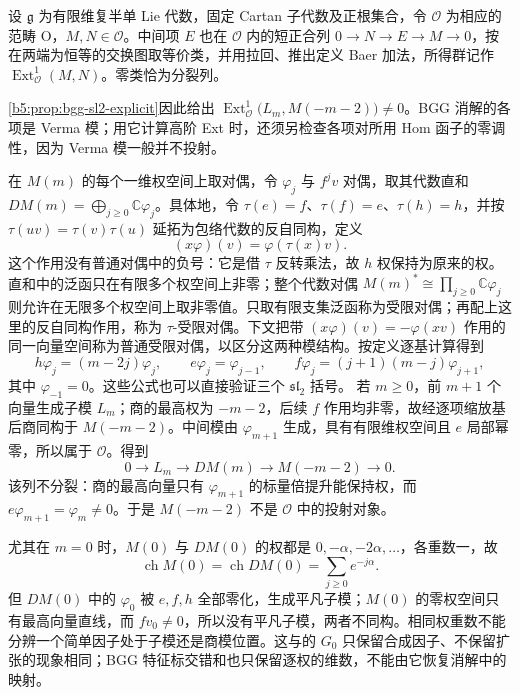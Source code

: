 \begin{definition}\label{b5:def:yoneda-ext-o}
	设 \(\mathfrak g\) 为有限维复半单 Lie 代数，固定 Cartan 子代数及正根集合，令 \(\mathcal O\) 为相应的范畴 O，\(M,N\in\mathcal O\)。中间项 \(E\) 也在 \(\mathcal O\) 内的短正合列 \(0\to N\to E\to M\to0\)，按在两端为恒等的交换图取等价类，并用拉回、推出定义 Baer 加法，所得群记作 \(\operatorname{Ext}^1_{\mathcal O}(M,N)\)。零类恰为分裂列。
\end{definition}

\cref{b5:prop:bgg-sl2-explicit}因此给出 \(\operatorname{Ext}^1_{\mathcal O}\bigl(L_m,M(-m-2)\bigr)\ne0\)。BGG 消解的各项是 Verma 模；用它计算高阶 Ext 时，还须另检查各项对所用 Hom 函子的零调性，因为 Verma 模一般并不投射。

\begin{example}\label{b5:exm:o-costandard-sl2}
	在 \(M(m)\) 的每个一维权空间上取对偶，令 \(\varphi_j\) 与 \(f^jv\) 对偶，取其代数直和 \(D M(m)=\bigoplus_{j\ge0}\mathbb C\varphi_j\)。具体地，令 \(\tau(e)=f\)、\(\tau(f)=e\)、\(\tau(h)=h\)，并按 \(\tau(uv)=\tau(v)\tau(u)\) 延拓为包络代数的反自同构，定义
	\[
		(x\varphi)(v)=\varphi(\tau(x)v).
	\]
	这个作用没有普通对偶中的负号：它是借 \(\tau\) 反转乘法，故 \(h\) 权保持为原来的权。直和中的泛函只在有限多个权空间上非零；整个代数对偶 \(M(m)^*\cong\prod_{j\ge0}\mathbb C\varphi_j\) 则允许在无限多个权空间上取非零值。只取有限支集泛函称为受限对偶；再配上这里的反自同构作用，称为 \(\tau\)-受限对偶。下文把带 \((x\varphi)(v)=-\varphi(xv)\) 作用的同一向量空间称为普通受限对偶，以区分这两种模结构。按定义逐基计算得到
	\[
		h\varphi_j=(m-2j)\varphi_j,\qquad e\varphi_j=\varphi_{j-1},\qquad f\varphi_j=(j+1)(m-j)\varphi_{j+1},
	\]
	其中 \(\varphi_{-1}=0\)。这些公式也可以直接验证三个 \(\mathfrak{sl}_2\) 括号。 若 \(m\ge0\)，前 \(m+1\) 个向量生成子模 \(L_m\)；商的最高权为 \(-m-2\)，后续 \(f\) 作用均非零，故经逐项缩放基后商同构于 \(M(-m-2)\)。中间模由 \(\varphi_{m+1}\) 生成，具有有限维权空间且 \(e\) 局部幂零，所以属于 \(\mathcal O\)。得到
	\[
		0\longrightarrow L_m\longrightarrow D M(m) \longrightarrow M(-m-2)\longrightarrow0.
	\]
	该列不分裂：商的最高向量只有 \(\varphi_{m+1}\) 的标量倍提升能保持权，而 \(e\varphi_{m+1}=\varphi_m\ne0\)。于是 \(M(-m-2)\) 不是 \(\mathcal O\) 中的投射对象。
\end{example}

尤其在 \(m=0\) 时，\(M(0)\) 与 \(DM(0)\) 的权都是 \(0,-\alpha,-2\alpha,\ldots\)，各重数一，故
\[
	\operatorname{ch}M(0)=\operatorname{ch}DM(0) =\sum_{j\ge0}e^{-j\alpha}.
\]
但 \(DM(0)\) 中的 \(\varphi_0\) 被 \(e,f,h\) 全部零化，生成平凡子模；\(M(0)\) 的零权空间只有最高向量直线，而 \(fv_0\ne0\)，所以没有平凡子模，两者不同构。相同权重数不能分辨一个简单因子处于子模还是商模位置。这与的 \(G_0\) 只保留合成因子、不保留扩张的现象相同；BGG 特征标交错和也只保留逐权的维数，不能由它恢复消解中的映射。

